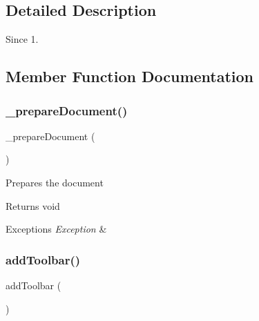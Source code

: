 \subsection{Detailed Description}
\begin{DoxySince}{Since}
1. 
\end{DoxySince}


\subsection{Member Function Documentation}
\mbox{\label{classtks__agenda_view_newsitems_aa6beb02534f5e57801141ad50e7adec5}} 
\subsubsection{\+\_\+prepare\+Document()}
{\footnotesize\ttfamily \+\_\+prepare\+Document (\begin{DoxyParamCaption}{ }\end{DoxyParamCaption})\hspace{0.3cm}{\ttfamily [protected]}}

Prepares the document

\begin{DoxyReturn}{Returns}
void
\end{DoxyReturn}

\begin{DoxyExceptions}{Exceptions}
{\em Exception} & \\
\hline
\end{DoxyExceptions}
\mbox{\label{classtks__agenda_view_newsitems_af327e89538be614e923c7e5863319f43}} 
\subsubsection{add\+Toolbar()}
{\footnotesize\ttfamily add\+Toolbar (\begin{DoxyParamCaption}{ }\end{DoxyParamCaption})\hspace{0.3cm}{\ttfamily [protected]}}

